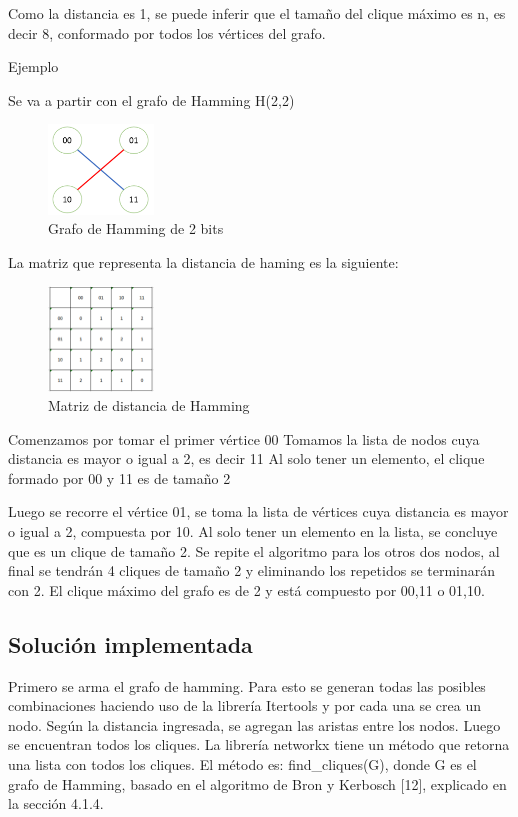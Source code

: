 \documentclass[conference,compsoc]{IEEEtran}
\begin{document}
{Como la distancia es 1, se puede inferir que el tamaño del clique máximo es n, es decir 8, conformado por todos los vértices del grafo.

Ejemplo

Se va a partir con el grafo de Hamming H(2,2)
\begin{figure}[h] 
    \centering
    \includegraphics[width=0.25\textwidth]{Problema3/t2.png}
    \caption{Grafo de Hamming de 2 bits}
    \label{fig:mesh1}
\end{figure}
$$$$$$$$$$$$$$$$$$$$
La matriz que representa la distancia de haming es la siguiente:
$$$$
\begin{figure}[h] 
    \centering
    \includegraphics[width=0.25\textwidth]{Problema3/t3.png}
    \caption{Matriz de distancia de Hamming}
    \label{fig:mesh1}
\end{figure}
$$$$$$$$
Comenzamos por tomar el primer vértice 00
Tomamos la lista de nodos cuya distancia es mayor o igual a 2, es decir 11
Al solo tener un elemento, el clique formado por 00 y 11 es de tamaño 2

Luego se recorre el vértice 01, se toma la lista de vértices cuya distancia es mayor o igual a 2, compuesta por 10. Al solo tener un elemento en la lista, se concluye que es un clique de tamaño 2.
Se repite el algoritmo para los otros dos nodos, al final se tendrán 4 cliques de tamaño 2 y eliminando los repetidos se terminarán con 2.
El clique máximo del grafo es de 2 y está compuesto por {00,11} o {01,10}.

\subsection{Solución implementada}

Primero se arma el grafo de hamming. Para esto se generan todas las posibles combinaciones haciendo uso de la librería Itertools y por cada una se crea un nodo. Según la distancia ingresada, se agregan las aristas entre los nodos.
Luego se encuentran todos los cliques. La librería networkx tiene un método que retorna una lista con todos los cliques. El método es: find\_cliques(G), donde G es el grafo de Hamming, basado en el algoritmo de Bron y Kerbosch [12], explicado en la sección 4.1.4.

}
\end{document}
